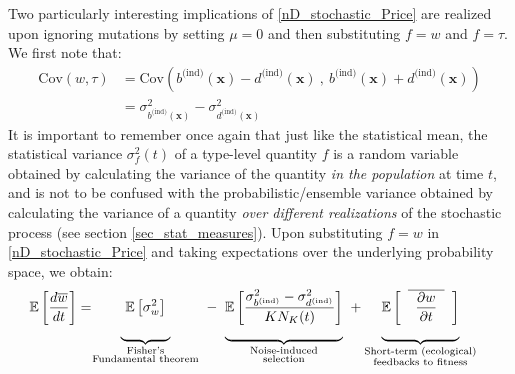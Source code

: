 Two particularly interesting implications of \eqref{nD_stochastic_Price} are realized upon ignoring mutations by setting $\mu = 0$ and then substituting $f=w$ and $f = \tau$. We first note that:
\begin{align}
\textrm{Cov}(w,\tau) &=\textrm{Cov}\left( b^{\textrm{(ind)}}(\mathbf{x}) - d^{\textrm{(ind)}}(\mathbf{x}) \ , \   b^{\textrm{(ind)}}(\mathbf{x}) + d^{\textrm{(ind)}}(\mathbf{x})\right)\\
&= \sigma^2_{b^{\textrm{(ind)}}(\mathbf{x})} - \sigma^2_{d^{\textrm{(ind)}}(\mathbf{x})}\label{nD_cross_covariance}
\end{align}
It is important to remember once again that just like the statistical mean, the statistical variance $\sigma^2_{f}(t)$ of a type-level quantity $f$ is a random variable obtained by calculating the variance of the quantity \emph{in the population} at time $t$, and is not to be confused with the probabilistic/ensemble variance obtained by calculating the variance of a quantity \emph{over different realizations} of the stochastic process (see section \ref{sec_stat_measures}). Upon substituting $f = w$ in \eqref{nD_stochastic_Price} and taking expectations over the underlying probability space, we obtain:
\begin{align}
\label{nD_stochastic_Fisher}
\mathbb{E}\left[\frac{d\overline{w}}{dt}\right] &= 
\negmedspace {\underbrace{\mystrut{4ex} \ \vphantom{ \frac{\sigma^2_{b^{\textrm{(ind)}}} - \sigma^2_{d^{\textrm{(ind)}}}}{KN_K(t)} } \mathbb{E}\left[\sigma^2_{w}\right] \ }_{\substack{\text{Fisher's} \\ \text{Fundamental theorem}}}} \ - \ {\underbrace{\mystrut{4ex}\mathbb{E}\left[\frac{\sigma^2_{b^{\textrm{(ind)}}} - \sigma^2_{d^{\textrm{(ind)}}}}{KN_K(t)}\right]}_{\substack{\text{Noise-induced} \\ \text{selection}}}} \ + {\underbrace{\mystrut{4ex} \vphantom{ \frac{\sigma^2_{b^{\textrm{(ind)}}} - \sigma^2_{d^{\textrm{(ind)}}}}{KN_K(t)} } \mathbb{E}\left[\hphantom{a}\overline{\hphantom{a}\frac{\partial w}{\partial t}\hphantom{a}}\hphantom{a}\right]}_{\substack{\text{Short-term (ecological)} \\ \text{feedbacks to fitness}}}}
\end{align}

